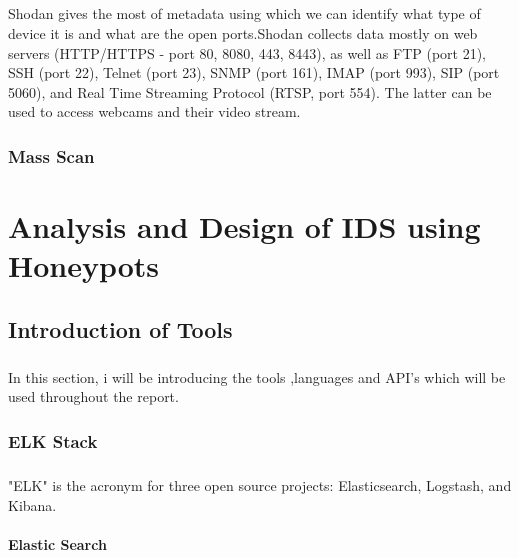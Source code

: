 \documentclass{report}
\begin{document}
\paragraph{}
Shodan gives the most of metadata using which we can identify what type of device it is and what are the open ports.Shodan collects data mostly on web servers (HTTP/HTTPS - port 80, 8080, 443, 8443), as well as FTP (port 21), SSH (port 22), Telnet (port 23), SNMP (port 161), IMAP (port 993), SIP (port 5060), and Real Time Streaming Protocol (RTSP, port 554). The latter can be used to access webcams and their video stream.


\subsection{Mass Scan}













\chapter{Analysis and Design of IDS using Honeypots}

\section{Introduction of Tools}

\paragraph{}
In this section, i will be introducing the tools ,languages and API's which will be used throughout the report.

\subsection{ELK Stack}
\paragraph{}
"ELK" is the acronym for three open source projects: Elasticsearch, Logstash, and Kibana.

\subsubsection{Elastic Search}
\end{document}
